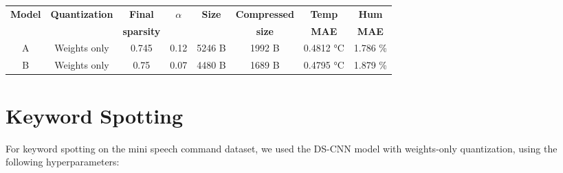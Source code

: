 \documentclass{article}
\begin{document}
\begin{center}
\begin{tabular}{ |c|c|c|c|c|c|c|c| } 
\hline
\vspace{-0.09cm}

\textbf{Model} &\textbf{Quantization} & \textbf{Final} & \textbf{$\alpha$} &\textbf{Size} &\textbf{Compressed} &\textbf{Temp}&\textbf{Hum} \\
&&\textbf{sparsity}&&&\textbf{size}&\textbf{MAE}&\textbf{MAE}\\
\hline
A&Weights only & 0.745 & 0.12 & 5246 B & 1992 B & 0.4812 °C & 1.786 \% \\ 
B&Weights only & 0.75  & 0.07 & 4480 B & 1689 B & 0.4795 °C & 1.879 \% \\ 
\hline

\end{tabular}

\end{center}


\section{Keyword Spotting}

For keyword spotting on the mini speech command dataset, we used the DS-CNN model with weights-only quantization, using the following hyperparameters:
\end{document}
